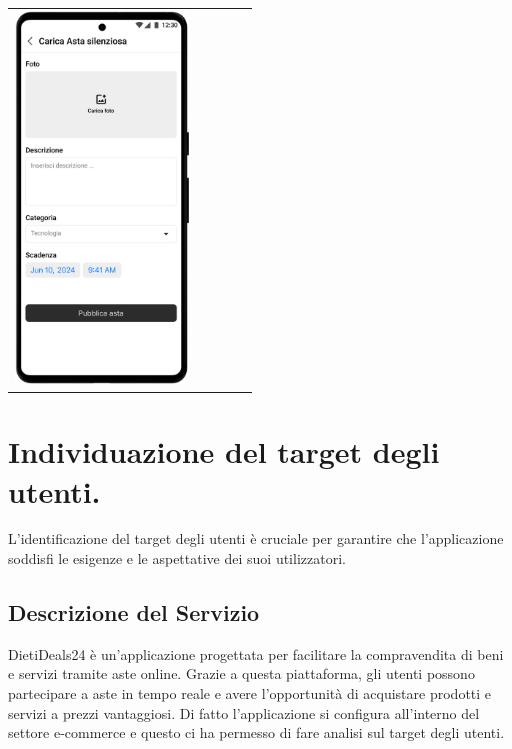 \begin{center}
\begin{tabular}{ccccc}
		\includegraphics[height=280pt]{assets/mockup/Carica Asta 1.1 Asta Silenziosa.png}       \\
	\end{tabular}
\end{center}





\newpage

\section{Individuazione del target degli utenti.}
L'identificazione del target degli utenti è cruciale per garantire che l'applicazione soddisfi le esigenze e le aspettative dei suoi utilizzatori.

\subsection*{Descrizione del Servizio}
DietiDeals24 è un'applicazione progettata per facilitare la compravendita di beni e servizi tramite aste online.
Grazie a questa piattaforma, gli utenti possono partecipare a aste in tempo reale e avere l'opportunità di acquistare prodotti e servizi a prezzi vantaggiosi.\sskip
Di fatto l'applicazione si configura all'interno del settore e-commerce e questo ci ha permesso di fare analisi sul target degli utenti.

